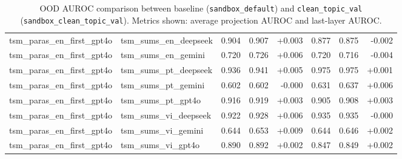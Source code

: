 \begin{table}[t]
\begin{tabular}{llrrrrrr}
tsm\_paras\_en\_first\_gpt4o & tsm\_sums\_en\_deepseek & 0.904 & 0.907 & +0.003 & 0.877 & 0.875 & -0.002 \\
tsm\_paras\_en\_first\_gpt4o & tsm\_sums\_en\_gemini & 0.720 & 0.726 & +0.006 & 0.720 & 0.716 & -0.004 \\
tsm\_paras\_en\_first\_gpt4o & tsm\_sums\_pt\_deepseek & 0.936 & 0.941 & +0.005 & 0.975 & 0.975 & +0.001 \\
tsm\_paras\_en\_first\_gpt4o & tsm\_sums\_pt\_gemini & 0.602 & 0.602 & -0.000 & 0.631 & 0.637 & +0.006 \\
tsm\_paras\_en\_first\_gpt4o & tsm\_sums\_pt\_gpt4o & 0.916 & 0.919 & +0.003 & 0.905 & 0.908 & +0.003 \\
tsm\_paras\_en\_first\_gpt4o & tsm\_sums\_vi\_deepseek & 0.922 & 0.928 & +0.006 & 0.935 & 0.935 & -0.000 \\
tsm\_paras\_en\_first\_gpt4o & tsm\_sums\_vi\_gemini & 0.644 & 0.653 & +0.009 & 0.644 & 0.646 & +0.002 \\
tsm\_paras\_en\_first\_gpt4o & tsm\_sums\_vi\_gpt4o & 0.890 & 0.892 & +0.002 & 0.847 & 0.849 & +0.002 \\
\hline
\end{tabular}
\caption{OOD AUROC comparison between baseline (\texttt{sandbox\_default}) and \texttt{clean\_topic\_val} (\texttt{sandbox\_clean\_topic\_val}). Metrics shown: average projection AUROC and last-layer AUROC.}
\label{tab:ood_baseline_vs_clean_topic_val}
\end{table}
